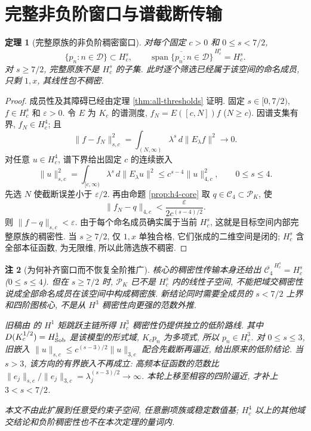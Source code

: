 \documentclass[UTF8]{ctexart}
\newtheorem{theorem}{定理}[section]
\newtheorem{remark}[theorem]{注}
\begin{document}
\section{完整非负阶窗口与谱截断传输}
\begin{theorem}[完整原族的非负阶稠密窗口]\label{thm:main}
对每个固定 $c>0$ 和 $0\le s<7/2$,
\[
 \{p_n:n\in\mathcal D\}\subset H_c^s,\qquad
 \overline{\operatorname{span}\{p_n:n\in\mathcal D\}}^{\,H_c^s}=H_c^s.
\]
对 $s\ge7/2$, 完整原族不是 $H_c^s$ 的子集.
此时逐个筛选已经属于该空间的命名成员, 只剩 $1,x$, 其线性包不稠密.
\end{theorem}
\begin{proof}
成员性及其障碍已经由定理 \ref{thm:all-thresholds} 证明.
固定 $s\in[0,7/2)$, $f\in H_c^s$ 和 $\varepsilon>0$.
令 $E$ 为 $K_c$ 的谱测度, $f_N=E([c,N])f$ ($N\ge c$).
因谱支集有界, $f_N\in H_c^4$; 且
\[
 \|f-f_N\|_{s,c}^2
 =\int_{(N,\infty)}\lambda^s\,d\|E_\lambda f\|^2\longrightarrow0.
\]
对任意 $u\in H_c^4$, 谱下界给出固定 $c$ 的连续嵌入
\begin{equation}\label{eq:h4-embedding}
 \|u\|_{s,c}^2
 =\int_{[c,\infty)}\lambda^s\,d\|E_\lambda u\|^2
 \le c^{s-4}\|u\|_{4,c}^2,\qquad 0\le s\le4.
\end{equation}
先选 $N$ 使截断误差小于 $\varepsilon/2$.
再由命题 \ref{prop:h4-core} 取 $q\in\mathcal C_4\subset\mathcal P_K$, 使
\[
 \|f_N-q\|_{4,c}<\frac{\varepsilon}{2c^{(s-4)/2}}.
\]
则 $\|f-q\|_{s,c}<\varepsilon$. 由于每个命名成员确实属于当前 $H_c^s$,
这就是目标空间内部完整原族的稠密性.
当 $s\ge7/2$, 仅 $1,x$ 单独合格, 它们张成的二维空间是闭的;
$H_c^s$ 含全部本征函数, 为无限维, 所以此筛选族不稠密.
\end{proof}

\begin{remark}[为何补齐窗口而不恢复全阶推广]
核心的稠密性传输本身还给出
$\overline{\mathcal C_4}^{\,H_c^s}=H_c^s$ ($0\le s\le4$).
但在 $s\ge7/2$ 时, $\mathcal P_K$ 已不是 $H_c^s$ 内的线性子空间,
不能把域交稠密性说成全部命名成员在该空间中构成稠密族.
新结论同时需要全成员的 $s<7/2$ 上界和四阶图核心, 不是从
$H^3$ 稠密性向更强的范数外推.

旧稿由 \cite{h3} 的 $H^1$ 矩跳跃主链所得 $H_c^3$ 稠密性仍提供独立的低阶路线.
其中 $D(K_c^{1/2})=H^1_{\rm Sob}$ 是该模型的形式域,
$K_cp_n$ 为多项式, 所以 $p_n\in H_c^3$.
对 $0\le s\le3$, 旧嵌入
$\|u\|_{s,c}\le c^{(s-3)/2}\|u\|_{3,c}$
配合先截断再逼近, 给出原来的低阶结论.
当 $s>3$, 该方向的有界嵌入不再成立: 高频本征函数的范数比
$\|e_j\|_{s,c}/\|e_j\|_{3,c}=\lambda_j^{(s-3)/2}\to\infty$.
本轮上移至相容的四阶逼近, 才补上 $3<s<7/2$.

本文不由此扩展到任意受约束子空间, 任意删项族或稳定数值基;
$H_c^4$ 以上的其他域交结论和负阶稠密性也不在本次定理的量词内.
\end{remark}
\end{document}
